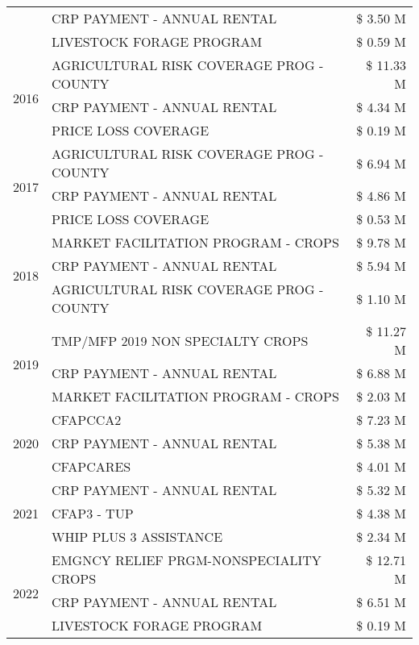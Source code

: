 \begin{tabular}{llr}
 & CRP PAYMENT - ANNUAL RENTAL & \$ 3.50 M \\
 & LIVESTOCK FORAGE PROGRAM & \$ 0.59 M \\
\cline{1-3}
\multirow[t]{3}{*}{2016} & AGRICULTURAL RISK COVERAGE PROG - COUNTY & \$ 11.33 M \\
 & CRP PAYMENT - ANNUAL RENTAL & \$ 4.34 M \\
 & PRICE LOSS COVERAGE & \$ 0.19 M \\
\cline{1-3}
\multirow[t]{3}{*}{2017} & AGRICULTURAL RISK COVERAGE PROG - COUNTY & \$ 6.94 M \\
 & CRP PAYMENT - ANNUAL RENTAL & \$ 4.86 M \\
 & PRICE LOSS COVERAGE & \$ 0.53 M \\
\cline{1-3}
\multirow[t]{3}{*}{2018} & MARKET FACILITATION PROGRAM - CROPS & \$ 9.78 M \\
 & CRP PAYMENT - ANNUAL RENTAL & \$ 5.94 M \\
 & AGRICULTURAL RISK COVERAGE PROG - COUNTY & \$ 1.10 M \\
\cline{1-3}
\multirow[t]{3}{*}{2019} & TMP/MFP 2019 NON SPECIALTY CROPS & \$ 11.27 M \\
 & CRP PAYMENT - ANNUAL RENTAL & \$ 6.88 M \\
 & MARKET FACILITATION PROGRAM - CROPS & \$ 2.03 M \\
\cline{1-3}
\multirow[t]{3}{*}{2020} & CFAPCCA2 & \$ 7.23 M \\
 & CRP PAYMENT - ANNUAL RENTAL & \$ 5.38 M \\
 & CFAPCARES & \$ 4.01 M \\
\cline{1-3}
\multirow[t]{3}{*}{2021} & CRP PAYMENT - ANNUAL RENTAL & \$ 5.32 M \\
 & CFAP3 - TUP & \$ 4.38 M \\
 & WHIP PLUS 3 ASSISTANCE & \$ 2.34 M \\
\cline{1-3}
\multirow[t]{3}{*}{2022} & EMGNCY RELIEF PRGM-NONSPECIALITY CROPS & \$ 12.71 M \\
 & CRP PAYMENT - ANNUAL RENTAL & \$ 6.51 M \\
 & LIVESTOCK FORAGE PROGRAM & \$ 0.19 M \\
\cline{1-3}
\bottomrule
\end{tabular}
